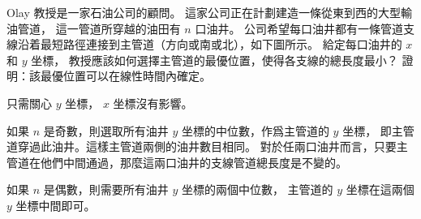 Olay 教授是一家石油公司的顧問。
這家公司正在計劃建造一條從東到西的大型輸油管道，
這一管道所穿越的油田有 $n$ 口油井。
公司希望每口油井都有一條管道支線沿着最短路徑連接到主管道（方向或南或北），如下圖所示。
給定每口油井的 $x$ 和 $y$ 坐標，
教授應該如何選擇主管道的最優位置，使得各支線的總長度最小？
證明：該最優位置可以在線性時間內確定。

\externalfigure[output/e9_3_9-1]
\stopEXERCISE

\startANSWER
只需關心 $y$ 坐標， $x$ 坐標沒有影響。

如果 $n$ 是奇數，則選取所有油井 $y$ 坐標的中位數，作爲主管道的 $y$ 坐標，
即主管道穿過此油井。這樣主管道兩側的油井數目相同。
對於任兩口油井而言，只要主管道在他們中間通過，那麼這兩口油井的支線管道總長度是不變的。

如果 $n$ 是偶數，則需要所有油井 $y$ 坐標的兩個中位數，
主管道的 $y$ 坐標在這兩個 $y$ 坐標中間即可。
\stopANSWER
